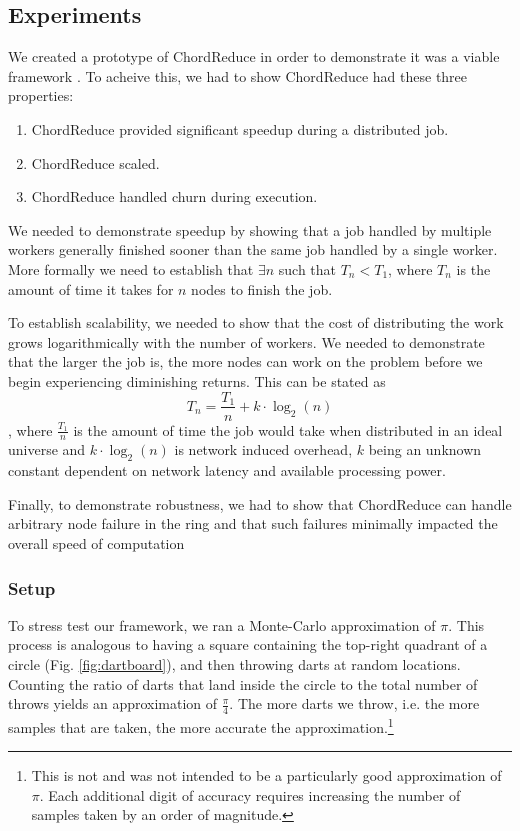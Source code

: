 \subsection{Experiments}

We created a prototype of ChordReduce in order to demonstrate it was a viable framework \cite{chordreduce}.
To acheive this, we had to show ChordReduce had these three properties:
\begin{enumerate}
	\item ChordReduce provided significant speedup during a distributed job.
	\item ChordReduce scaled.
	\item ChordReduce handled churn during execution.
\end{enumerate}


We needed to demonstrate speedup by showing that a job handled by multiple workers generally finished sooner than the same job handled by a single worker.  
More formally we need to establish that $\exists n$ such that $T_{n} < T_{1}$, where $T_{n}$ is the amount of time it takes for $n$ nodes to finish the job.

To establish scalability, we needed to show that the cost of distributing the work grows logarithmically with the number of workers.  
We needed to demonstrate that the larger the job is, the more nodes can work on the problem before we begin experiencing diminishing returns. 
This can be stated as $$T_{n} = \frac{T_{1}}{n} + k \cdot \log_{2}(n)$$, where $\frac{T_{1}}{n}$ is the amount of time the job would take when distributed in an ideal universe and $k \cdot \log_{2}(n)$ is network induced overhead, $k$ being an unknown constant dependent on network latency and available processing power.

Finally, to demonstrate robustness, we had to show that ChordReduce can handle arbitrary node failure in the ring and that such failures minimally impacted the overall speed of computation

\subsubsection{Setup}


To stress test our framework, we ran a Monte-Carlo approximation of $\pi$. 
This process is analogous to having a square containing  the top-right quadrant of a circle (Fig. \ref{fig:dartboard}), and then throwing darts at random locations.  
Counting the ratio of darts that land inside the circle to the total number of throws yields an approximation of $\frac{\pi}{4}$.  
The more darts we throw, i.e. the more samples that are taken, the more accurate the approximation.\footnote{This is not and was not intended to be a particularly good approximation of $\pi$.
Each additional digit of accuracy requires increasing the number of samples taken by an order of magnitude.}


